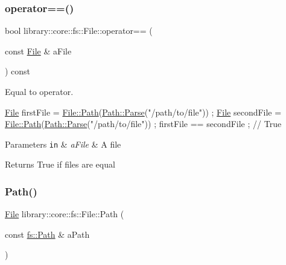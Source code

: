 \subsubsection{\texorpdfstring{operator==()}{operator==()}}
{\footnotesize\ttfamily bool library\+::core\+::fs\+::\+File\+::operator== (\begin{DoxyParamCaption}\item[{const \hyperlink{classlibrary_1_1core_1_1fs_1_1_file}{File} \&}]{a\+File }\end{DoxyParamCaption}) const}



Equal to operator. 


\begin{DoxyCode}
\hyperlink{classlibrary_1_1core_1_1fs_1_1_file_a6f3f0d79545ac9984c6f49432f0c6c39}{File} firstFile = \hyperlink{classlibrary_1_1core_1_1fs_1_1_file_a72d6cdf8bb7e299889c6149e2b8a6cc7}{File::Path}(\hyperlink{classlibrary_1_1core_1_1fs_1_1_path_a6ba644b6609507e724c217bf2020f5ae}{Path::Parse}(\textcolor{stringliteral}{"/path/to/file"})) ;
\hyperlink{classlibrary_1_1core_1_1fs_1_1_file_a6f3f0d79545ac9984c6f49432f0c6c39}{File} secondFile = \hyperlink{classlibrary_1_1core_1_1fs_1_1_file_a72d6cdf8bb7e299889c6149e2b8a6cc7}{File::Path}(\hyperlink{classlibrary_1_1core_1_1fs_1_1_path_a6ba644b6609507e724c217bf2020f5ae}{Path::Parse}(\textcolor{stringliteral}{"/path/to/file"})) ;
firstFile == secondFile ; \textcolor{comment}{// True}
\end{DoxyCode}



\begin{DoxyParams}[1]{Parameters}
\mbox{\tt in}  & {\em a\+File} & A file \\
\hline
\end{DoxyParams}
\begin{DoxyReturn}{Returns}
True if files are equal 
\end{DoxyReturn}
\mbox{\label{classlibrary_1_1core_1_1fs_1_1_file_a72d6cdf8bb7e299889c6149e2b8a6cc7}} 
\subsubsection{\texorpdfstring{Path()}{Path()}}
{\footnotesize\ttfamily \hyperlink{classlibrary_1_1core_1_1fs_1_1_file}{File} library\+::core\+::fs\+::\+File\+::\+Path (\begin{DoxyParamCaption}\item[{const \hyperlink{classlibrary_1_1core_1_1fs_1_1_path}{fs\+::\+Path} \&}]{a\+Path }\end{DoxyParamCaption})\hspace{0.3cm}{\ttfamily [static]}}



